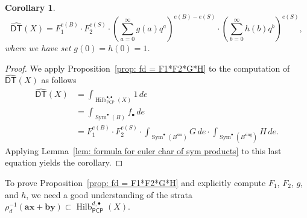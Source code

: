 \documentclass[12pt]{amsart}
\newtheorem{corollary}[theorem]{Corollary}
\theoremstyle{definition}
\newcommand{\Sym}{\operatorname{Sym}}
\newcommand{\Hilb}{\operatorname{Hilb}}
\newcommand{\DT}{\mathsf{DT}}
\newcommand{\sm}{\operatorname{sm}}
\newcommand{\sing}{\operatorname{sing}}
\newcommand{\boldx}{\boldsymbol{x}}
\newcommand{\boldy}{\boldsymbol{y}}
\newcommand{\bolda}{\boldsymbol{a}}
\newcommand{\boldb}{\boldsymbol{b}}
\newcommand{\DThat}{\widehat{\DT}}
\newcommand{\PCP}{\mathsf{PCP}}
\begin{document}
\begin{corollary}\label{cor: DThat = F1^{e(B)}F2^{e(S)}(sum g q^{a})^{e(B)-e(S)}...}
\[
\DThat (X) = F_{1}^{e(B)}\cdot F_{2}^{e(S)}\cdot
\left(\sum_{a=0}^{\infty}g(a) q^{a} \right)^{e(B)-e(S)}\cdot
\left(\sum_{b=0}^{\infty}h(b) q^{b} \right)^{e(S)},
\]
where we have set $g(0)=h(0)=1$.
\end{corollary}
\begin{proof}
We apply Proposition~\ref{prop: fd = F1*F2*G*H} to the computation of
$\DThat (X)$ as follows
\begin{align*}
\DThat (X)&= \int_{\Hilb^{\bullet ,\bullet}_{\PCP}(X)} 1\, de\\
&=\int_{\Sym^{\bullet}(B)}f_{\bullet } \, de \\
&= F_{1}^{e(B)}\cdot F_{2}^{e(S)}\cdot  \int_{\Sym^{\bullet}(B^{\sm})}
G\,de \cdot  \int_{\Sym^{\bullet}(B^{\sing})}
H\,de .
\end{align*}
Applying Lemma~\ref{lem: formula for euler char of sym products} to
this last equation yields the corollary. 
\end{proof}


To prove Proposition~\ref{prop: fd = F1*F2*G*H} and explicitly
compute $F_{1}$, $F_{2}$, $g$, and $h$, we need a good understanding
of the strata $\rho_{d}^{-1} (\bolda \boldx +\boldb \boldy )\subset
\Hilb^{d,\bullet}_{\PCP}(X)$.
\end{document}
